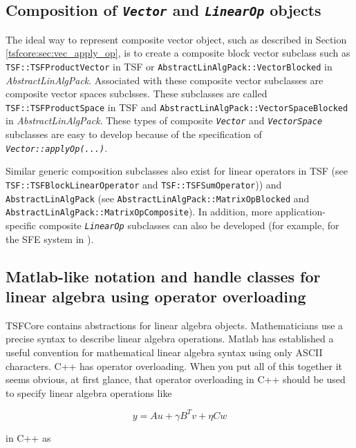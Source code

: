 %
\subsection{Composition of \texttt{\textit{Vector}} and \texttt{\textit{LinearOp}} objects}
%

The ideal way to represent composite vector object, such as described
in Section \ref{tsfcore:sec:vec_apply_op}, is to create a composite
block vector subclass such as \texttt{TSF\-::TSF\-Product\-Vector} in TSF or
\texttt{Abstract\-Lin\-Alg\-Pack\-::Vector\-Blocked} in
\textit{Abstract\-Lin\-AlgP\-ack}.  Associated with these composite vector
subclasses are composite vector spaces subclsses.  These subclasses
are called \texttt{TSF\-::TSF\-Product\-Space} in TSF and
\texttt{Abstract\-Lin\-Alg\-Pack\-::Vector\-Space\-Blocked} in
\textit{Abstract\-Lin\-Alg\-Pack}.  These types of composite
\texttt{\textit{Vector}} and \texttt{\textit{VectorSpace}} subclasses
are easy to develop because of the specification of
\texttt{\textit{Vector\-::applyOp(\-...)}}.

Similar generic composition subclasses also exist for linear operators
in TSF (see \texttt{TSF\-::TSF\-Block\-Linear\-Operator} and
\texttt{TSF\-::TSF\-Sum\-Operator})) and \texttt{AbstractLinAlgPack} (see
\texttt{Abstract\-Lin\-Alg\-Pack\-::Matrix\-Op\-Blocked} and
\texttt{Abstract\-Lin\-Alg\-Pack\-::Matrix\-Op\-Composite}).  In addition, more
application-specific composite \texttt{\textit{LinearOp}} subclasses
can also be developed (for example, for the SFE system in
\cite{ref:sfe}).

%
\subsection{Matlab-like notation and handle classes for linear algebra
using operator overloading}
\label{tsfcore:sec:operator_overloading}
%

TSFCore contains abstractions for linear algebra objects.  Mathematicians
use a precise syntax to describe linear algebra operations.  Matlab
\cite{ref:matlab} has established a useful convention for mathematical
linear algebra syntax using only ASCII characters.  C++ has operator
overloading.  When you put all of this together it seems obvious, at
first glance, that operator overloading in C++ should be used to
specify linear algebra operations like

\[
y = A u + \gamma B^T v + \eta C w
\]

in C++ as


